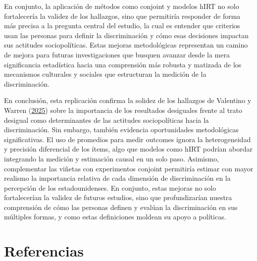 \documentclass[
  13pt,
  a4paper,
]{article}
\begin{document}
En conjunto, la aplicación de métodos como conjoint y modelos hIRT no solo fortalecería la validez de los hallazgos, sino que permitiría responder de forma más precisa a la pregunta central del estudio, la cual es entender que criterios usan las personas para definir la discriminación y cómo esas decisiones impactan sus actitudes sociopolíticas. Estas mejoras metodológicas representan un camino de mejora para futuras investigaciones que busquen avanzar desde la mera significancia estadística hacia una comprensión más robusta y matizada de los mecanismos culturales y sociales que estructuran la medición de la discriminación.

En conclusión, esta replicación confirma la solidez de los hallazgos de Valentino y Warren (\protect\hyperlink{ref-valentino_cultural_2025}{2025}) sobre la importancia de los resultados desiguales frente al trato desigual como determinantes de las actitudes sociopolíticas hacia la discriminación. Sin embargo, también evidencia oportunidades metodológicas significativas. El uso de promedios para medir outcomes ignora la heterogeneidad y precisión diferencial de los ítems, algo que modelos como hIRT podrían abordar integrando la medición y estimación causal en un solo paso. Asimismo, complementar las viñetas con experimentos conjoint permitiría estimar con mayor realismo la importancia relativa de cada dimensión de discriminación en la percepción de los estadounidenses. En conjunto, estas mejoras no solo fortalecerían la validez de futuros estudios, sino que profundizarían nuestra comprensión de cómo las personas definen y evalúan la discriminación en sus múltiples formas, y como estas definiciones moldean su apoyo a políticas.

\hypertarget{referencias}{%
\section{Referencias}\label{referencias}}
\end{document}
